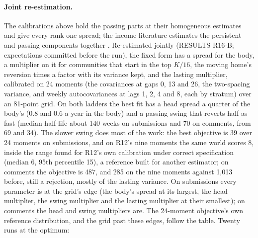 \documentclass[10pt]{article}
\begin{document}
\paragraph{Joint re-estimation.} The calibrations above hold the passing parts at their homogeneous estimates and give every rank one spread; the income literature estimates the persistent and passing components together \cite{guvenen2009,hryshko2012}. Re-estimated jointly (RESULTS R16-B; expectations committed before the run), the fixed form has a spread for the body, a multiplier on it for communities that start in the top $K/16$, the moving home's reversion times a factor with its variance kept, and the lasting multiplier, calibrated on 24 moments (the covariances at gaps 0, 13 and 26, the two-spacing variance, and weekly autocovariances at lags 1, 2, 4 and 8, each by stratum) over an 81-point grid. On both ladders the best fit has a head spread a quarter of the body's (0.8 and 0.6 a year in the body) and a passing swing that reverts half as fast (median half-life about 140 weeks on submissions and 70 on comments, from 69 and 34). The slower swing does most of the work: the best objective is 39 over 24 moments on submissions, and on R12's nine moments the same world scores 8, inside the range found for R12's own calibration under correct specification (median 6, 95th percentile 15), a reference built for another estimator; on comments the objective is 487, and 285 on the nine moments against 1,013 before, still a rejection, mostly of the lasting variance. On submissions every parameter is at the grid's edge (the body's spread at its largest, the head multiplier, the swing multiplier and the lasting multiplier at their smallest); on comments the head and swing multipliers are. The 24-moment objective's own reference distribution, and the grid past these edges, follow the table. Twenty runs at the optimum:
\end{document}
